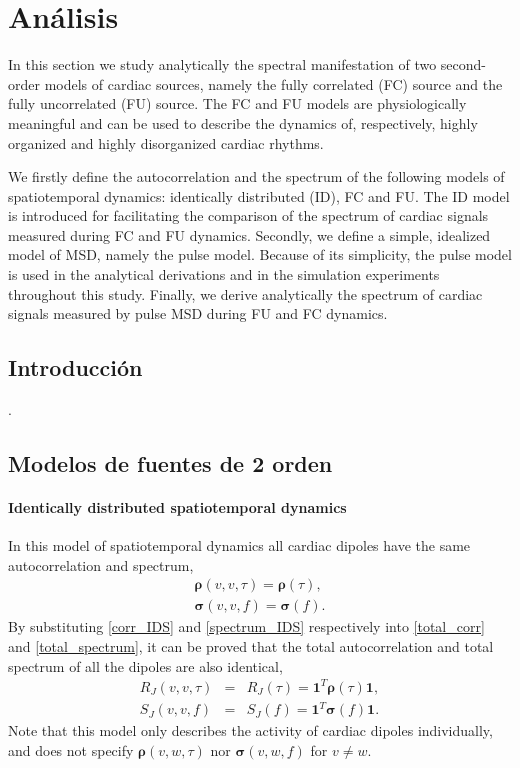 
\chapter{Análisis}

\begin{resumen}
 In this section we study analytically the spectral manifestation of two
 second-order models of cardiac sources, namely the fully correlated (FC) source
 and the fully uncorrelated (FU) source.  The FC and FU models are
 physiologically meaningful and can be used to describe the dynamics of,
 respectively, highly organized and highly disorganized cardiac rhythms.

 We firstly define the autocorrelation and the spectrum of the following models
 of spatiotemporal dynamics: identically distributed (ID), FC and FU. The ID
 model is introduced for facilitating the comparison of the spectrum of cardiac
 signals measured during FC and FU dynamics. Secondly, we define a simple,
 idealized model of MSD, namely the pulse model. Because of its simplicity, the
 pulse model is used in the analytical derivations and in the simulation
 experiments throughout this study. Finally, we derive analytically the spectrum
 of cardiac signals measured by pulse MSD during FU and FC dynamics.


\end{resumen}

\section{Introducción}
.

\section{Modelos de fuentes de 2 orden}
\subsubsection{Identically distributed spatiotemporal dynamics}
In this model of spatiotemporal dynamics all cardiac dipoles have the same autocorrelation and spectrum,
\begin{eqnarray}
\boldsymbol{\rho}(v,v,\tau)=\boldsymbol{\rho}(\tau), \label{corr_IDS}\\
\boldsymbol{\sigma}(v,v,f)=\boldsymbol{\sigma}(f). \label{spectrum_IDS}
\end{eqnarray}
By substituting \eqref{corr_IDS} and \eqref{spectrum_IDS} respectively into \eqref{total_corr} and \eqref{total_spectrum}, it can be proved that the total autocorrelation and total spectrum of all the dipoles are also identical,
\begin{eqnarray}
R_{J}(v,v,\tau)&=&R_{J}(\tau)=\mathbf{1}^{T} \boldsymbol{\rho}(\tau)  \mathbf{1},\label{total_corr_IDS}\\
S_{J}(v,v,f)&=&S_{J}(f)=\mathbf{1}^{T} \boldsymbol{\sigma}(f)  \mathbf{1}. \label{total_spectrum_IDS}
\end{eqnarray}
Note that this model only describes the activity of cardiac dipoles individually, and does not specify $\boldsymbol{\rho}(v,w,\tau)$ nor $\boldsymbol{\sigma}(v,w,f)$ for $v\neq w$.

